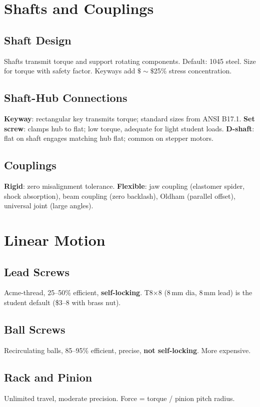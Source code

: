 \documentclass[11pt,letterpaper,twoside,openany]{book}
\begin{document}
\section{Shafts and Couplings}
\subsection{Shaft Design}
Shafts transmit torque and support rotating components. Default: 1045 steel. Size for torque with safety factor. Keyways add $\$\sim\$$25\% stress concentration.

\subsection{Shaft-Hub Connections}
\textbf{Keyway}: rectangular key transmits torque; standard sizes from ANSI B17.1. \textbf{Set screw}: clamps hub to flat; low torque, adequate for light student loads. \textbf{D-shaft}: flat on shaft engages matching hub flat; common on stepper motors.

\subsection{Couplings}
\textbf{Rigid}: zero misalignment tolerance. \textbf{Flexible}: jaw coupling (elastomer spider, shock absorption), beam coupling (zero backlash), Oldham (parallel offset), universal joint (large angles).

\section{Linear Motion}
\subsection{Lead Screws}
Acme-thread, 25--50\% efficient, \textbf{self-locking}. T8$\times$8 (8\,mm dia, 8\,mm lead) is the student default (\$3--8 with brass nut).

\subsection{Ball Screws}
Recirculating balls, 85--95\% efficient, precise, \textbf{not self-locking}. More expensive.

\subsection{Rack and Pinion}
Unlimited travel, moderate precision. Force = torque / pinion pitch radius.
\end{document}
